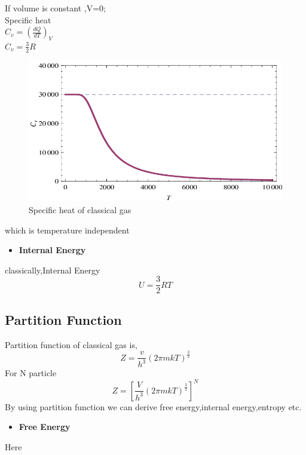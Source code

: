 \documentclass{article}
\newcommand*{\1}{\hspace{1pt}}
\begin{document}
If volume is constant ,V=0;\\

Specific heat\cite{l5}\\


   $  C_v  = \left(\frac{dQ}{dT}\right)_V $\\
    $    C_v =\frac{3}{2}R$\\
\begin{figure}[htb!]
    \centering
    \includegraphics[scale=0.3]{Cv}
    \caption{Specific heat of classical gas}
    \label{fig:my_label}
\end{figure}

which is temperature independent

\begin{itemize}
    \item \textbf{Internal Energy}
\end{itemize}

classically,Internal Energy\cite{l6} 
\begin{equation}
    U=\frac{3}{2}RT
\end{equation}
\subsection{\textbf{Partition Function}}

Partition function of classical gas is,
\begin{equation}
  Z=\frac{v}{h^3}(2\pi mkT)^{\frac{3}{2}}  
\end{equation}
For N particle 
\begin{equation}
    Z=[\frac{V}{h^3}(2\pi mkT)^{\frac{3}{2}}]^N
\end{equation}
By using partition function we can derive free energy,internal energy,entropy etc\cite{l6}.
\begin{itemize}
    \item \textbf{Free Energy}
\end{itemize}
Here\\
\end{document}
